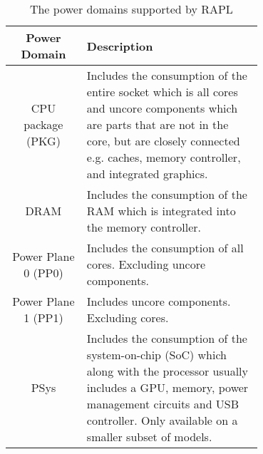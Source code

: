 \begin{table}[ht]
    \centering
    \begin{tabular}{| c | p{0.7\linewidth}|}
    \hline
    \textbf{Power Domain}  & \textbf{Description}                            \\ \hline
    CPU package (PKG)        & Includes the consumption of the entire socket which is all cores and uncore components which are parts that are not in the core, but are closely connected e.g. caches, memory controller, and integrated graphics.       \\ \hline
    DRAM                & Includes the consumption of the RAM which is integrated into the memory controller.                       \\ \hline
    Power Plane 0 (PP0)                 & Includes the consumption of all cores. Excluding uncore components.               \\ \hline
    Power Plane 1 (PP1)      & Includes uncore components. Excluding cores.           \\ \hline
    PSys & Includes the consumption of the system-on-chip (SoC) which along with the processor usually includes a GPU, memory, power management circuits and USB controller. Only available on a smaller subset of models.       \\ \hline
    \end{tabular}
    \caption{The power domains supported by RAPL}
    \label{tab:RAPL_Domain}
    \end{table}
